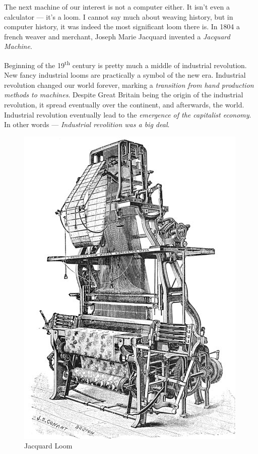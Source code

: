 \documentclass{report}
\begin{document}
            The next machine of our interest is not a computer either. It isn't even a calculator --- it's a loom. I cannot say much about weaving history, 
            but in computer history, it was indeed the most significant loom there is. In 1804 a french weaver and merchant, Joseph Marie Jacquard invented a \emph{Jacquard Machine}. \par

            Beginning of the 19\textsuperscript{th} century is pretty much a middle of industrial revolution. New fancy industrial looms are practically a 
            symbol of the new era. Industrial revolution changed our world forever, marking a \emph{transition from hand production methods to machines}.
            Despite Great Britain being the origin of the industrial revolution, it spread eventually over the continent, and afterwards, the world. 
            Industrial revolution eventually lead to the \emph{emergence of the capitalist economy}. In other words --- \emph{Industrial revolition was a big deal}. \par

            \begin{figure}
                \centering
                \includegraphics[scale=0.2]{images/devices/device_jacquard_loom.jpg}
                \caption{Jacquard Loom}
            \end{figure}
\end{document}
